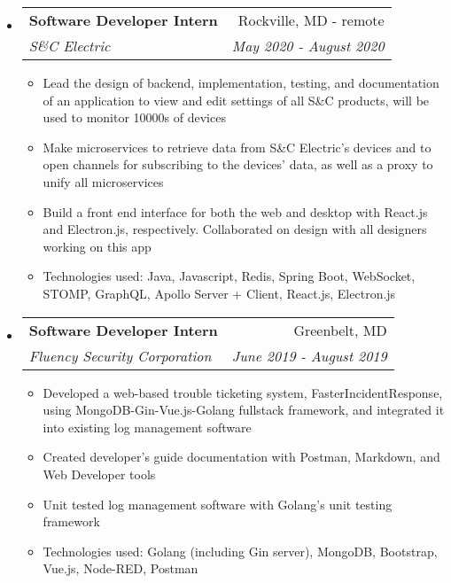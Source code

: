 \documentclass[letterpaper,10pt]{article}
\makeatletter
\newcommand{\resitem}[1]{\item #1 \vspace{-3.5pt}}
\newcommand{\ressubheading}[4]{
\begin{tabular*}{7.0in}{l@{\extracolsep{\fill}}r}
		\textbf{#1} & #2 \\
		\textit{#3} & \textit{#4} \\
\end{tabular*}\vspace{-6pt}}
\makeatother
\begin{document}
\begin{itemize}
\item
    \ressubheading{Software Developer Intern}{Rockville, MD - remote}{S\&C Electric}{May 2020 - August 2020}
    \begin{itemize}
        \resitem{Lead the design of backend, implementation, testing, and documentation of an application to view and edit settings of all S\&C products, will be used to monitor 10000s of devices}
        \resitem{Make microservices to retrieve data from S\&C Electric's devices and to open channels for subscribing to the devices' data, as well as a proxy to unify all microservices}
        \resitem{Build a front end interface for both the web and desktop with React.js and Electron.js, respectively. Collaborated on design with all designers working on this app}
        \resitem{Technologies used: Java, Javascript, Redis, Spring Boot, WebSocket, STOMP, GraphQL, Apollo Server + Client, React.js, Electron.js}
    \end{itemize}
\item
    \ressubheading{Software Developer Intern}{Greenbelt, MD}{Fluency Security Corporation}{June 2019 - August 2019}
	\begin{itemize}
	    \resitem{Developed a web-based trouble ticketing system, FasterIncidentResponse, using MongoDB-Gin-Vue.js-Golang fullstack framework, and integrated it into existing log management software}
		\resitem{Created developer's guide documentation with Postman, Markdown, and Web Developer tools}
		\resitem{Unit tested log management software with Golang's unit testing framework}
		\resitem{Technologies used: Golang (including Gin server), MongoDB, Bootstrap, Vue.js, Node-RED, Postman}
	\end{itemize}
\end{itemize}
\end{document}
